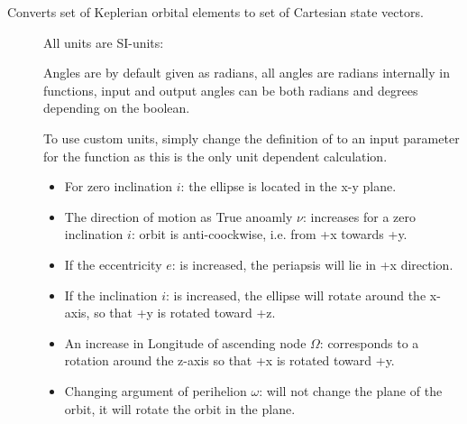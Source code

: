 \documentclass[letterpaper,10pt,english]{sphinxmanual}
\begin{document}

\begin{fulllineitems}
\label{\detokenize{modules/dpt_tools:dpt_tools.kep2cart}}
Converts set of Keplerian orbital elements to set of Cartesian state vectors.
\begin{description}
\item[{}] \leavevmode
All units are SI-units: 

Angles are by default given as radians, all angles are radians internally in functions, input and output angles can be both radians and degrees depending on the  boolean.

To use custom units, simply change the definition of  to an input parameter for the function as this is the only unit dependent calculation.

\item[{}] \leavevmode\begin{itemize}
\item {} 
For zero inclination \(i\): the ellipse is located in the x-y plane.

\item {} 
The direction of motion as True anoamly \(\nu\): increases for a zero inclination \(i\): orbit is anti-coockwise, i.e. from +x towards +y.

\item {} 
If the eccentricity \(e\): is increased, the periapsis will lie in +x direction.

\item {} 
If the inclination \(i\): is increased, the ellipse will rotate around the x-axis, so that +y is rotated toward +z.

\item {} 
An increase in Longitude of ascending node \(\Omega\): corresponds to a rotation around the z-axis so that +x is rotated toward +y.

\item {} 
Changing argument of perihelion \(\omega\): will not change the plane of the orbit, it will rotate the orbit in the plane.


\end{itemize}
\end{description}
\end{fulllineitems}
\end{document}
